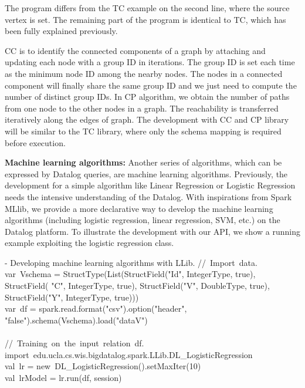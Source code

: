 \eldl
The program differs from the TC example on the second line, where the source vertex is set. The remaining part of the program is identical to TC, which has been fully explained previously. 

CC is to identify the connected components of a graph by attaching and updating each node with a group ID in iterations. The group ID is set each time as the minimum node ID among the nearby nodes. The nodes in a connected component will finally share the same group ID and we just need to compute the number of distinct group IDs. In CP algorithm, we obtain the number of paths from one node to  the other nodes in a graph. The reachability  is transferred iteratively along the edges of graph. The development with CC and CP library will be similar to the TC library, where only the schema mapping is required before execution. 

\textbf{Machine learning algorithms:}
Another series of algorithms, which can be expressed by Datalog queries, are  machine learning algorithms.  Previously, the development for a simple algorithm like Linear Regression or Logistic Regression needs the intensive understanding of the Datalog. With inspirations from Spark MLlib, we provide a more declarative way to develop the machine learning algorithms (including logistic regression, linear regression, SVM, etc.)  on the Datalog platform. 
To illustrate the development with our API, we show a running example exploiting the logistic regression class.

\vspace{0.5em}
 - Developing machine learning algorithms with LLib.
\vspace{-2em}
\bldl
//\ Import\ data. 
\\
var\ Vschema = StructType(List(StructField("Id", IntegerType, true), \\StructField(
"C", IntegerType, true),
StructField("V", DoubleType, true),\\ StructField("Y", IntegerType, true))) \\

var\ df = spark.read.format("csv").option("header", "false").schema(Vschema).load("dataV") \\
\\
//\ Training\ on\ the\ input\ relation\ df. \\
import\ edu.ucla.cs.wis.bigdatalog.spark.LLib.DL\_LogisticRegression \\
val\ lr = new\  DL\_LogisticRegression().setMaxIter(10) \\
val\ lrModel = lr.run(df, session)

